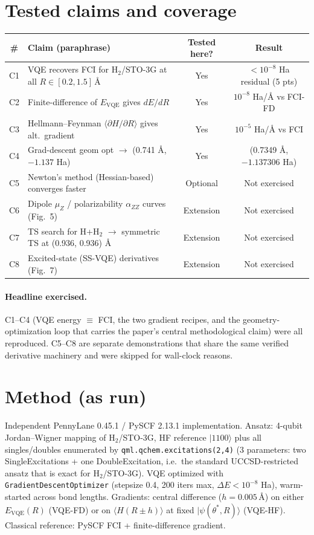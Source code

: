 \documentclass[11pt]{article}
\begin{document}
\section{Tested claims and coverage}
\begin{center}\small
\begin{tabular}{clcc}
\toprule
\# & Claim (paraphrase) & Tested here? & Result \\
\midrule
C1 & VQE recovers FCI for H$_2$/STO-3G at all $R \in [0.2,1.5]$\,\AA & Yes & $<10^{-8}$ Ha residual (5 pts) \\
C2 & Finite-difference of $E_{\text{VQE}}$ gives $dE/dR$ & Yes & $10^{-8}$ Ha/\AA{} vs FCI-FD \\
C3 & Hellmann--Feynman $\langle \partial H / \partial R\rangle$ gives alt.\ gradient & Yes & $10^{-5}$ Ha/\AA{} vs FCI \\
C4 & Grad-descent geom opt $\to$ (0.741 \AA, $-1.137$ Ha) & Yes & (0.7349 \AA, $-1.137306$ Ha) \\
C5 & Newton's method (Hessian-based) converges faster & Optional & Not exercised \\
C6 & Dipole $\mu_Z$ / polarizability $\alpha_{ZZ}$ curves (Fig.\ 5) & Extension & Not exercised \\
C7 & TS search for H+H$_2$ $\to$ symmetric TS at (0.936, 0.936) \AA & Extension & Not exercised \\
C8 & Excited-state (SS-VQE) derivatives (Fig.\ 7) & Extension & Not exercised \\
\bottomrule
\end{tabular}
\end{center}

\paragraph{Headline exercised.} C1--C4 (VQE energy $\equiv$ FCI, the two gradient
recipes, and the geometry-optimization loop that carries the paper's central
methodological claim) were all reproduced. C5--C8 are separate demonstrations
that share the same verified derivative machinery and were skipped for wall-clock reasons.

\section{Method (as run)}
Independent PennyLane 0.45.1 / PySCF 2.13.1 implementation. Ansatz: 4-qubit
Jordan--Wigner mapping of H$_2$/STO-3G, HF reference $|1100\rangle$ plus all
singles/doubles enumerated by \texttt{qml.qchem.excitations(2,4)} (3
parameters: two SingleExcitations + one DoubleExcitation, i.e.\ the standard
UCCSD-restricted ansatz that is exact for H$_2$/STO-3G). VQE optimized with
\texttt{GradientDescentOptimizer} (stepsize 0.4, 200 iters max,
$\Delta E < 10^{-8}$ Ha), warm-started across bond lengths. Gradients: central
difference ($h = 0.005$\,\AA) on either $E_{\text{VQE}}(R)$ (VQE-FD) or on
$\langle H(R\pm h) \rangle$ at fixed $|\psi(\theta^*, R)\rangle$ (VQE-HF).
Classical reference: PySCF FCI + finite-difference gradient.
\end{document}
